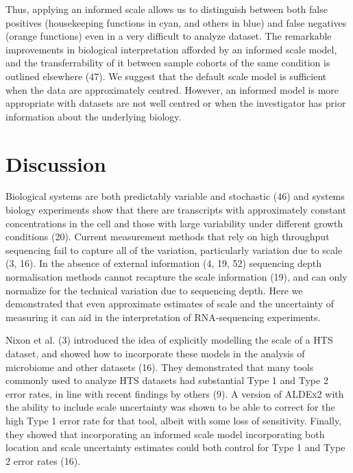 \documentclass[
]{article}
\begin{document}
Thus, applying an informed scale allows us to distinguish between both
false positives (housekeeping functions in cyan, and others in blue) and
false negatives (orange functions) even in a very difficult to analyze
dataset. The remarkable improvements in biological interpretation
afforded by an informed scale model, and the transferrability of it
between sample cohorts of the same condition is outlined elsewhere (47).
We suggest that the default scale model is sufficient when the data are
approximately centred. However, an informed model is more appropriate
with datasets are not well centred or when the investigator has prior
information about the underlying biology.

\section{Discussion}\label{discussion}

Biological systems are both predictably variable and stochastic (46) and
systems biology experiments show that there are transcripts with
approximately constant concentrations in the cell and those with large
variability under different growth conditions (20). Current measurement
methods that rely on high throughput sequencing fail to capture all of
the variation, particularly variation due to scale (3, 16). In the
absence of external information (4, 19, 52) sequencing depth
normalisation methods cannot recapture the scale information (19), and
can only normalize for the technical variation due to sequencing depth.
Here we demonstrated that even approximate estimates of scale and the
uncertainty of measuring it can aid in the interpretation of
RNA-sequencing experiments.

Nixon et al. (3) introduced the idea of explicitly modelling the scale
of a HTS dataset, and showed how to incorporate these models in the
analysis of microbiome and other datasets (16). They demonstrated that
many tools commonly used to analyze HTS datasets had substantial Type 1
and Type 2 error rates, in line with recent findings by others (9). A
version of ALDEx2 with the ability to include scale uncertainty was
shown to be able to correct for the high Type 1 error rate for that
tool, albeit with some loss of sensitivity. Finally, they showed that
incorporating an informed scale model incorporating both location and
scale uncertainty estimates could both control for Type 1 and Type 2
error rates (16).
\end{document}
